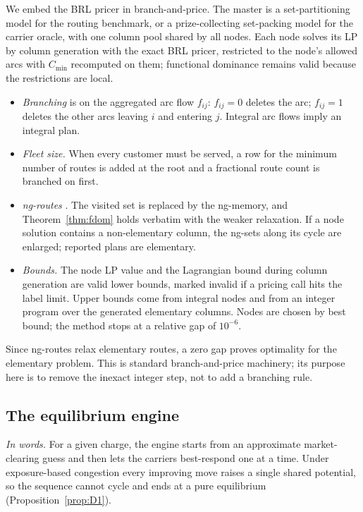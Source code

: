 \documentclass[preprint,11pt]{elsarticle}
\theoremstyle{definition}
\theoremstyle{remark}
\begin{document}
We embed the BRL pricer in branch-and-price. The master is a set-partitioning model for the routing benchmark, or a prize-collecting set-packing model for the carrier oracle, with one column pool shared by all nodes. Each node solves its LP by column generation with the exact BRL pricer, restricted to the node's allowed arcs with $C_{\min}$ recomputed on them; functional dominance remains valid because the restrictions are local.
\begin{itemize}[leftmargin=*]
\item \emph{Branching} is on the aggregated arc flow $f_{ij}$: $f_{ij}=0$ deletes the arc; $f_{ij}=1$ deletes the other arcs leaving $i$ and entering $j$. Integral arc flows imply an integral plan.
\item \emph{Fleet size.} When every customer must be served, a row for the minimum number of routes is added at the root and a fractional route count is branched on first.
\item \emph{ng-routes} \citep{Baldacci2011}. The visited set is replaced by the ng-memory, and Theorem~\ref{thm:fdom} holds verbatim with the weaker relaxation. If a node solution contains a non-elementary column, the ng-sets along its cycle are enlarged; reported plans are elementary.
\item \emph{Bounds.} The node LP value and the Lagrangian bound during column generation are valid lower bounds, marked invalid if a pricing call hits the label limit. Upper bounds come from integral nodes and from an integer program over the generated elementary columns. Nodes are chosen by best bound; the method stops at a relative gap of $10^{-6}$.
\end{itemize}
Since ng-routes relax elementary routes, a zero gap proves optimality for the elementary problem. This is standard branch-and-price machinery; its purpose here is to remove the inexact integer step, not to add a branching rule.

\subsection{The equilibrium engine}\label{sec:engine}

\emph{In words.} For a given charge, the engine starts from an approximate market-clearing guess and then lets the carriers best-respond one at a time. Under exposure-based congestion every improving move raises a single shared potential, so the sequence cannot cycle and ends at a pure equilibrium (Proposition~\ref{prop:D1}).
\end{document}
